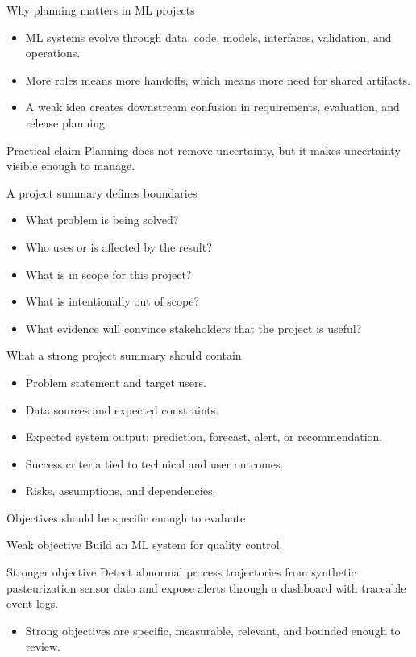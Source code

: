 \begin{frame}{Why planning matters in ML projects}
\begin{itemize}
\item ML systems evolve through data, code, models, interfaces, validation, and operations.
\item More roles means more handoffs, which means more need for shared artifacts.
\item A weak idea creates downstream confusion in requirements, evaluation, and release planning.
\end{itemize}
\begin{block}{Practical claim}
Planning does not remove uncertainty, but it makes uncertainty visible enough to manage.
\end{block}
\coursefooter
\end{frame}

\begin{frame}{A project summary defines boundaries}
\begin{itemize}
\item What problem is being solved?
\item Who uses or is affected by the result?
\item What is in scope for this project?
\item What is intentionally out of scope?
\item What evidence will convince stakeholders that the project is useful?
\end{itemize}
\coursefooter
\end{frame}

\begin{frame}{What a strong project summary should contain}
\begin{itemize}
\item Problem statement and target users.
\item Data sources and expected constraints.
\item Expected system output: prediction, forecast, alert, or recommendation.
\item Success criteria tied to technical and user outcomes.
\item Risks, assumptions, and dependencies.
\end{itemize}
\coursefooter
\end{frame}

\begin{frame}{Objectives should be specific enough to evaluate}
\begin{block}{Weak objective}
Build an ML system for quality control.
\end{block}
\begin{block}{Stronger objective}
Detect abnormal process trajectories from synthetic pasteurization sensor data and expose alerts through a dashboard with traceable event logs.
\end{block}
\begin{itemize}
\item Strong objectives are specific, measurable, relevant, and bounded enough to review.
\end{itemize}
\coursefooter
\end{frame}

